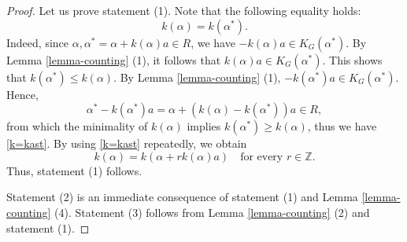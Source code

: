 \documentclass[11pt]{amsart}
\newcommand{\Z}{\mathbb{Z}}
\begin{document}
\begin{proof}
Let us prove statement (1). Note that the following equality holds:
\begin{equation}\label{k=kast}
k(\alpha)=k(\alpha^\ast).
\end{equation}
Indeed, since $\alpha,\alpha^\ast=\alpha+k(\alpha)a\in R$, we have 
$-k(\alpha)a\in K_G(\alpha^\ast)$. By Lemma \ref{lemma-counting} (1), 
 it follows that
$k(\alpha)a \in K_G(\alpha^\ast)$. This shows that $k(\alpha^\ast)\leq k(\alpha)$.   
By Lemma \ref{lemma-counting} (1), 
$-k(\alpha^\ast)a\in K_G(\alpha^\ast)$. Hence, 
\[\alpha^*-k(\alpha^\ast)a=\alpha+(k(\alpha)-k(\alpha^\ast))a\in R,\]
from which the minimality of $k(\alpha)$ implies $k(\alpha^\ast) \geq k(\alpha)$,
 thus we have \eqref{k=kast}. By using \eqref{k=kast} repeatedly, we obtain
\[k(\alpha)=k(\alpha+rk(\alpha)a)\quad\text{for every $r\in\Z$}.\]
Thus, statement (1) follows.

Statement (2) is an immediate consequence of statement (1) and Lemma 
\ref{lemma-counting} (4).
Statement (3) follows from Lemma \ref{lemma-counting} (2) and 
statement (1). 
\end{proof}
\vskip 3mm
\end{document}
